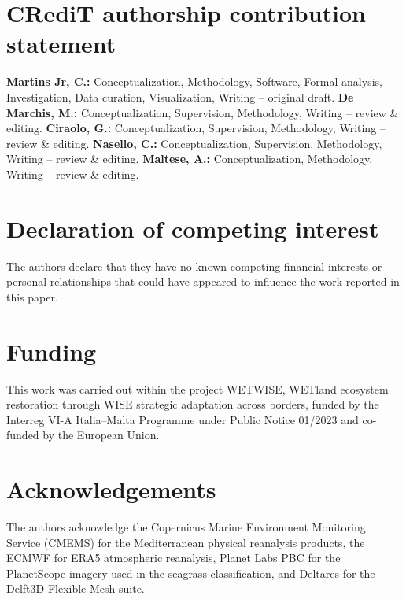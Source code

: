 \documentclass[review,12pt,authoryear]{elsarticle}
\begin{document}
\section*{CRediT authorship contribution statement}
\textbf{Martins Jr, C.:} Conceptualization, Methodology, Software, Formal
analysis, Investigation, Data curation, Visualization, Writing -- original
draft. \textbf{De Marchis, M.:} Conceptualization, Supervision, Methodology,
Writing -- review \& editing. \textbf{Ciraolo, G.:} Conceptualization,
Supervision, Methodology, Writing -- review \& editing. \textbf{Nasello, C.:}
Conceptualization, Supervision, Methodology, Writing -- review \& editing.
\textbf{Maltese, A.:} Conceptualization, Methodology, Writing -- review \&
editing.

\section*{Declaration of competing interest}
The authors declare that they have no known competing financial interests or
personal relationships that could have appeared to influence the work reported
in this paper.

\section*{Funding}
This work was carried out within the project WETWISE, WETland ecosystem
restoration through WISE strategic adaptation across borders, funded by the
Interreg VI-A Italia--Malta Programme under Public Notice 01/2023 and
co-funded by the European Union.

\section*{Acknowledgements}

The authors acknowledge the Copernicus Marine Environment Monitoring Service
(CMEMS) for the Mediterranean physical reanalysis products, the ECMWF for ERA5
atmospheric reanalysis, Planet Labs PBC for the PlanetScope imagery used in
the seagrass classification, and Deltares for the Delft3D Flexible Mesh suite.
\end{document}
